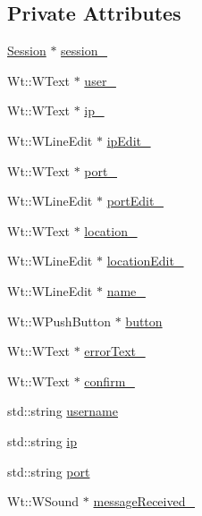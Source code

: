 \subsection*{Private Attributes}
\begin{DoxyCompactItemize}
\item 
\hyperlink{class_session}{Session} $\ast$ \hyperlink{class_bridge_control_widget_a8515acd4aba4adfc0ca0f303cc774714}{session\+\_\+}
\item 
Wt\+::\+W\+Text $\ast$ \hyperlink{class_bridge_control_widget_aade9df1dc99afdac9fe1aca212957556}{user\+\_\+}
\item 
Wt\+::\+W\+Text $\ast$ \hyperlink{class_bridge_control_widget_a0976b686d1bee46834e28b70220a9bbc}{ip\+\_\+}
\item 
Wt\+::\+W\+Line\+Edit $\ast$ \hyperlink{class_bridge_control_widget_a853916f1753968ac0a897ebaa5c0cbcc}{ip\+Edit\+\_\+}
\item 
Wt\+::\+W\+Text $\ast$ \hyperlink{class_bridge_control_widget_a0eae40d451b31b92112ec212516372cb}{port\+\_\+}
\item 
Wt\+::\+W\+Line\+Edit $\ast$ \hyperlink{class_bridge_control_widget_a41af1fb420ff88d4e4d3981b3c6e5c04}{port\+Edit\+\_\+}
\item 
Wt\+::\+W\+Text $\ast$ \hyperlink{class_bridge_control_widget_ad3a9a0bd678c760b74ef61b5c78bbea3}{location\+\_\+}
\item 
Wt\+::\+W\+Line\+Edit $\ast$ \hyperlink{class_bridge_control_widget_a69f59affca4084dd6be95e637e4d0a37}{location\+Edit\+\_\+}
\item 
Wt\+::\+W\+Line\+Edit $\ast$ \hyperlink{class_bridge_control_widget_a34ffd7c6178a84184d43b1f403fd1945}{name\+\_\+}
\item 
Wt\+::\+W\+Push\+Button $\ast$ \hyperlink{class_bridge_control_widget_ae44e24e9f180d7d8727a5989467a627e}{button}
\item 
Wt\+::\+W\+Text $\ast$ \hyperlink{class_bridge_control_widget_a3a1af1bc24a550a4bff633f62cb54b00}{error\+Text\+\_\+}
\item 
Wt\+::\+W\+Text $\ast$ \hyperlink{class_bridge_control_widget_a8fc1ea20843b3715ddbf72ef4aa84c6c}{confirm\+\_\+}
\item 
std\+::string \hyperlink{class_bridge_control_widget_ac195eb9bda89539ad76dcb68c183d7d3}{username}
\item 
std\+::string \hyperlink{class_bridge_control_widget_a0d2312d2fd67c2ed6a285d6c2e336d29}{ip}
\item 
std\+::string \hyperlink{class_bridge_control_widget_a1c8a761d43d554385f1d5416c611665c}{port}
\item 
Wt\+::\+W\+Sound $\ast$ \hyperlink{class_bridge_control_widget_a95671fff1cc255ba4d5eaaab4c1a8277}{message\+Received\+\_\+}
\end{DoxyCompactItemize}


